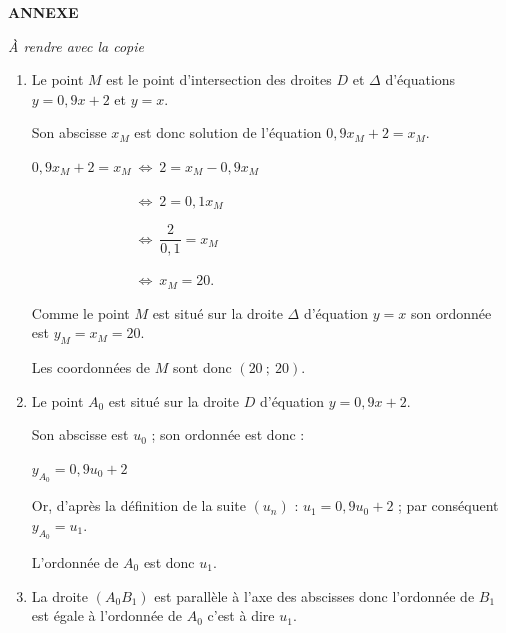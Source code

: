 \newpage
\begin{center}
     \textbf{ANNEXE}
\end{center}
\begin{center}
     \emph{\`A rendre avec la copie}
\end{center}

\begin{center}
\end{center}


\begin{corrige}
     \par
     \begin{enumerate}
          \item %
          Le point $M$ est le point d'intersection des droites $D$ et $\Delta$ d'équations $y=0,9x+2$ et $y=x$.
          \par
          Son abscisse $x_M$ est donc solution de l'équation $0,9x_M+2 = x_M$.
          \par
          $0,9x_M+2 = x_M\ \Leftrightarrow \ 2=x_M-0,9x_M$
          \par
          $\phantom{0,9x_M+2 = x_M}\ \Leftrightarrow \ 2=0,1x_M$
          \par
          $\phantom{0,9x_M+2 = x_M}\ \Leftrightarrow \ \dfrac{2}{0,1}=x_M$
          \par
          $\phantom{0,9x_M+2 = x_M}\ \Leftrightarrow \ x_M=20$.
          \par
          Comme le point $M$ est situé sur la droite $\Delta$ d'équation $y=x$ son ordonnée est $y_M=x_M=20$.
          \par
          Les coordonnées de $M$ sont donc $(20~;~20)$.
          \item %
          Le point $A_0$ est situé sur la droite $D$ d'équation $y=0,9x+2$.
          \par
          Son abscisse est $u_0$ ; son ordonnée est donc :
          \par
          $y_{A_0}=0,9u_0+2$
          \par
          Or, d'après la définition de la suite $(u_n)$ : $u_1=0,9u_0+2$ ; par conséquent $y_{A_0}=u_1$.
          \par
          L'ordonnée de $A_0$ est donc $u_1$.
          \item %
          La droite $(A_0B_1)$ est parallèle à l'axe des abscisses donc l'ordonnée de $B_1$ est égale à l'ordonnée de $A_0$ c'est à dire $u_1$.

\end{enumerate}
\end{corrige}
